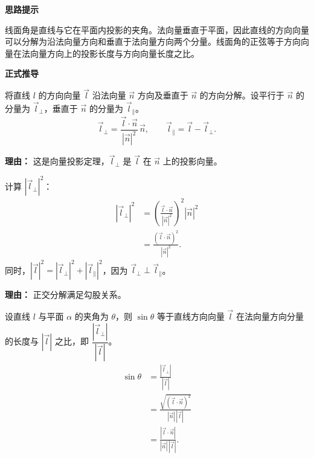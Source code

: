 \begin{proofbox}

	\textbf{\textcolor{CProof}{思路提示}}

	线面角是直线与它在平面内投影的夹角。法向量垂直于平面，因此直线的方向向量可以分解为沿法向量方向和垂直于法向量方向两个分量。线面角的正弦等于方向向量在法向量方向上的投影长度与方向向量长度之比。

	\medskip

	\textbf{\textcolor{CProof}{正式推导}}

	\begin{description}[style=nextline, leftmargin=2.8em, labelsep=0.5em, itemsep=0.55em]
		\item[\textbf{步骤一（向量分解）：}]
		      将直线 $l$ 的方向向量 $\vec{l}$ 沿法向量 $\vec{n}$ 方向及垂直于 $\vec{n}$ 的方向分解。设平行于 $\vec{n}$ 的分量为 $\vec{l}_{\perp}$，垂直于 $\vec{n}$ 的分量为 $\vec{l}_{\parallel}$。
		      \[
			      \vec{l}_{\perp} = \frac{\vec{l}\cdot\vec{n}}{|\vec{n}|^2}\,\vec{n},
			      \qquad
			      \vec{l}_{\parallel} = \vec{l} - \vec{l}_{\perp}.
		      \]

		      \par\textbf{理由：}
		      这是向量投影定理，$\vec{l}_{\perp}$ 是 $\vec{l}$ 在 $\vec{n}$ 上的投影向量。

		\item[\textbf{步骤二（长度关系）：}]
		      计算 $|\vec{l}_{\perp}|^2$：
		      \[
			      \begin{aligned}
				      |\vec{l}_{\perp}|^2
				       & = \left(\frac{\vec{l}\cdot\vec{n}}{|\vec{n}|^2}\right)^2 |\vec{n}|^2 \\
				       & = \frac{(\vec{l}\cdot\vec{n})^2}{|\vec{n}|^2}.
			      \end{aligned}
		      \]
		      同时，$|\vec{l}|^2 = |\vec{l}_{\perp}|^2 + |\vec{l}_{\parallel}|^2$，因为 $\vec{l}_{\perp} \perp \vec{l}_{\parallel}$。

		      \par\textbf{理由：}
		      正交分解满足勾股关系。

		\item[\textbf{步骤三（正弦定义）：}]
		      设直线 $l$ 与平面 $\alpha$ 的夹角为 $\theta$，则 $\sin\theta$ 等于直线方向向量 $\vec{l}$ 在法向量方向分量的长度与 $|\vec{l}|$ 之比，即 $\dfrac{|\vec{l}_{\perp}|}{|\vec{l}|}$。
		      \[
			      \begin{aligned}
				      \sin\theta
				       & = \frac{|\vec{l}_{\perp}|}{|\vec{l}|}                         \\
				       & = \frac{\sqrt{(\vec{l}\cdot\vec{n})^2}}{|\vec{n}|\,|\vec{l}|} \\
				       & = \frac{|\vec{l}\cdot\vec{n}|}{|\vec{n}|\,|\vec{l}|}.
			      \end{aligned}
		      \]


\end{description}
\end{proofbox}
